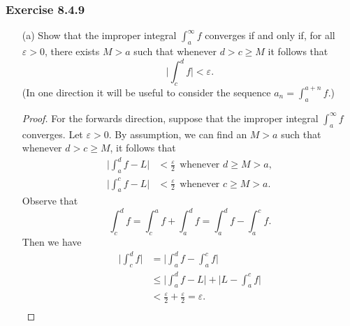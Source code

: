 \subsubsection{Exercise 8.4.9} 
\begin{enumerate}
    \item[(a)] Show that the improper integral \( \int_{ a }^{ \infty  } f  \) converges if and only if, for all \( \varepsilon > 0 \), there exists \( M > a  \) such that whenever \( d > c \geq M  \) it follows that 
        \[  \Big| \int_{ c }^{ d } f  \Big|  < \varepsilon. \]
        (In one direction it will be useful to consider the sequence \( a_{n} = \int_{ a }^{ a+ n  } f  \).)
        \begin{proof}
        For the forwards direction, suppose that the improper integral \( \int_{ a }^{ \infty  } f  \) converges. Let \( \varepsilon > 0  \). By assumption, we can find an \( M > a  \) such that whenever \(  d >  c \geq M  \), it follows that  
        \begin{align*}
            \Big| \int_{ a }^{ d } f  - L  \Big| &< \frac{ \varepsilon  }{ 2  } \ \ \text{whenever } d \geq M > a,  \\
            \Big| \int_{ a }^{ c } f - L  \Big| &< \frac{ \varepsilon  }{ 2  }  \ \ \text{whenever } c \geq M > a.
        \end{align*}
        Observe that 
        \[  \int_{ c }^{ d } f = \int_{ c }^{ a } f + \int_{ a }^{ d } f = \int_{ a }^{ d } f  - \int_{ a }^{ c } f.   \]
        Then we have 
        \begin{align*}
            \Big| \int_{ c }^{ d } f  \Big| &= \Big| \int_{ a }^{ d } f  - \int_{ a }^{ c } f  \Big|  \\
                                            &\leq \Big| \int_{ a }^{ d } f - L  \Big| + \Big| L - \int_{ a }^{ c } f  \Big| \\
                                            &< \frac{ \varepsilon  }{ 2  }  + \frac{ \varepsilon  }{ 2 } = \varepsilon. \\
        \end{align*}
        

\end{proof}
\end{enumerate}
